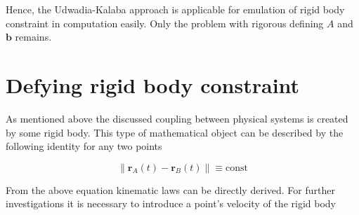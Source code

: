 Hence, the Udwadia-Kalaba approach is applicable for emulation of 
rigid body constraint in computation easily. Only the problem with rigorous 
defining $A$ and $\mathbf{b}$ remains.

\section{Defying rigid body constraint}
\label{sec:def_rigid_body_const}

As mentioned above the discussed coupling between physical systems is created 
by some rigid body. This type of mathematical object can be described by the 
following identity for any two points

\begin{equation}
    \| \mathbf{r}_A(t) - \mathbf{r}_B(t) \| \equiv \text{const}
    \label{eqn:rigid_body_axiom}
\end{equation}

From the above equation kinematic laws can be directly derived. For further 
investigations it is necessary to introduce a point's velocity of the rigid 
body

